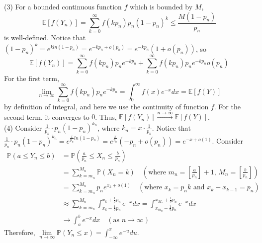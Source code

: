 \documentclass[12pt]{article}
\begin{document}
(3) For a bounded continuous function $f$ which is bounded by $M$, $$\mathbb{E}[f(Y_{n})]=\sum_{k=0}^{\infty}f(kp_{n})p_{n}(1-p_{n})^{k}\leqslant \frac{M(1-p_{n})}{p_{n}}$$ is well-defined.
Notice that $(1-p_{n})^{k}=e^{kln(1-p_{n})}=e^{-kp_{n}+o(p_{n})}=e^{-kp_{n}}(1+o(p_{n}))$, so $$\mathbb{E}[f(Y_{n})]=\sum_{k=0}^{\infty}f(kp_{n})p_{n}e^{-kp_{n}}+\sum_{k=0}^{\infty}f(kp_{n})p_{n}e^{-kp_{n}}o(p_{n})$$
For the first term, $$\lim_{n\rightarrow\infty}\sum_{k=0}^{\infty}f(kp_{n})p_{n}e^{-kp_{n}}=\int_{0}^{\infty}f(x)e^{-x}dx=\mathbb{E}[f(Y)]$$
by definition of integral, and here we use the continuity of function $f$. For the second term, it converges to $0$. Thus, $\mathbb{E}[f(Y_{n})]\xrightarrow{n\rightarrow\infty}\mathbb{E}[f(Y)]$.\\
(4) Consider $\frac{1}{p_{n}}\cdot p_{n}(1-p_{n})^{k_{n}}$, where $k_{n}=x\cdot\frac{1}{p_{n}}$. Notice that $\frac{1}{p_{n}}\cdot p_{n}(1-p_{n})^{k_{n}}=e^{\frac{x}{p_{n}}ln(1-p_{n})}=e^{\frac{x}{p_{n}}}(-p_{n}+o(p_{n}))=e^{-x+o(1)}$. Consider 
\begin{align*}
	\mathbb{P}(a\leqslant Y_{n}\leqslant b) &= \mathbb{P}(\frac{a}{p_{n}}\leqslant X_{n}\leqslant \frac{b}{p_{n}})\\
	&=\sum_{k=m_{n}}^{M_{n}}\mathbb{P}(X_{n}=k)\quad(\text{where $m_n=[\frac{a}{p_{n}}]+1$, $M_{n}=[\frac{b}{p_{n}}]$})\\
	&= \sum_{k=m_{n}}^{M_{n}}p_{n}e^{x_{k}+o(1)}\quad(\text{where $x_{k}=p_{n}k$ and $x_{k}-x_{k-1}=p_{n}$})\\
	&\approx\sum_{k=m_{n}}^{M_{n}}\int_{x_{k}-\frac{1}{2}p_{n}}^{x_{k}+\frac{1}{2}p_{n}}e^{-x}dx=\int_{x_{m_{n}}-\frac{1}{2}p_{n}}^{x_{M_{n}}+\frac{1}{2}p_{n}}e^{-x}dx\\
	& \rightarrow \int_{a}^{b}e^{-x}dx\quad(\text{as $n\rightarrow\infty$})
\end{align*}
Therefore, $\lim\limits_{n\rightarrow\infty}\mathbb{P}(Y_{n}\leqslant x)=\int_{-\infty}^{x}e^{-u}du$.
\end{document}
